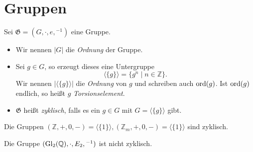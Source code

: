 \section{Gruppen}

\begin{definition}
    Sei $\mathfrak{G} = (G, \cdot, e, {}^{-1})$ eine Gruppe.
    \begin{itemize}
        \item Wir nennen $|G|$ die \emph{Ordnung} der Gruppe.
        \item Sei $g \in G$, so erzeugt dieses eine Untergruppe
        $$ \langle \{ g \} \rangle = \{ g^n \mid n \in \mathbb{Z} \}. $$
        Wir nennen $|\langle\{g\}\rangle|$ die \emph{Ordnung} von $g$ und schreiben auch $\operatorname{ord}(g)$. Ist $\operatorname{ord}(g)$ endlich, so heißt $g$ \emph{Torsionselement}.
        \item $\mathfrak{G}$ heißt \emph{zyklisch}, falls es ein $g \in G$ mit $G = \langle\{g\}\rangle$ gibt.
    \end{itemize}
\end{definition}

\begin{example}
    
\end{example}

\begin{example}
    Die Gruppen $(\mathbb{Z}, +, 0, -) = \langle\{1\}\rangle, (\mathbb{Z}_m, +, 0, -) = \langle\{1\}\rangle$ sind zyklisch.

    Die Gruppe $(\operatorname{Gl}_2(\mathbb{Q}), \cdot, E_2, {}^{-1})$ ist nicht zyklisch.
\end{example}